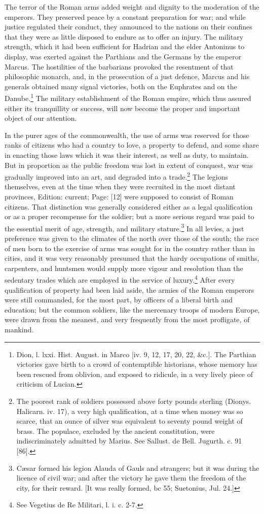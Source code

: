 The terror of the Roman arms added weight and dignity to the moderation of the emperors. They preserved peace by a constant preparation for war; and while justice regulated their conduct, they announced to the nations on their confines that they were as little disposed to endure as to offer an injury. The military strength, which it had been sufficient for Hadrian and the elder Antoninus to display, was exerted against the Parthians and the Germans by the emperor Marcus. The hostilities of the barbarians provoked the resentment of that philosophic monarch, and, in the prosecution of a just defence, Marcus and his generals obtained many signal victories, both on the Euphrates and on the Danube.\footnote{Dion, l. lxxi. Hist. August. in Marco [iv. 9, 12, 17, 20, 22, \&c.]. The Parthian victories gave birth to a crowd of contemptible historians, whose memory has been rescued from oblivion, and exposed to ridicule, in a very lively piece of criticism of Lucian.} The military establishment of the Roman empire, which thus assured either its tranquillity or success, will now become the proper and important object of our attention.

In the purer ages of the commonwealth, the use of arms was reserved for those ranks of citizens who had a country to love, a property to defend, and some share in enacting those laws which it was their interest, as well as duty, to maintain. But in proportion as the public freedom was lost in extent of conquest, war was gradually improved into an art, and degraded into a trade.\footnote{The poorest rank of soldiers possessed above forty pounds sterling (Dionys. Halicarn. iv. 17), a very high qualification, at a time when money was so scarce, that an ounce of silver was equivalent to seventy pound weight of brass. The populace, excluded by the ancient constitution, were indiscriminately admitted by Marius. See Sallust. de Bell. Jugurth. c. 91 [86].} The legions themselves, even at the time when they were recruited in the most distant provinces, Edition: current; Page: [12] were supposed to consist of Roman citizens. That distinction was generally considered either as a legal qualification or as a proper recompense for the soldier; but a more serious regard was paid to the essential merit of age, strength, and military stature.\footnote{Cæsar formed his legion Alauda of Gauls and strangers; but it was during the licence of civil war; and after the victory he gave them the freedom of the city, for their reward. [It was really formed, bc 55; Suetonius, Jul. 24.]} In all levies, a just preference was given to the climates of the north over those of the south; the race of men born to the exercise of arms was sought for in the country rather than in cities, and it was very reasonably presumed that the hardy occupations of smiths, carpenters, and huntsmen would supply more vigour and resolution than the sedentary trades which are employed in the service of luxury.\footnote{See Vegetius de Re Militari, l. i. c. 2-7.} After every qualification of property had been laid aside, the armies of the Roman emperors were still commanded, for the most part, by officers of a liberal birth and education; but the common soldiers, like the mercenary troops of modern Europe, were drawn from the meanest, and very frequently from the most profligate, of mankind.

